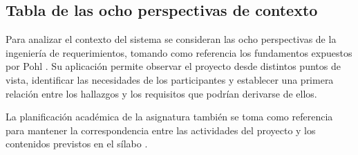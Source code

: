\documentclass[11pt,a4paper]{article}
\begin{document}
\subsection{Tabla de las ocho perspectivas de contexto}

Para analizar el contexto del sistema se consideran las ocho perspectivas de la ingeniería de requerimientos, tomando como referencia los fundamentos expuestos por Pohl \cite{pohl2015requirements}. Su aplicación permite observar el proyecto desde distintos puntos de vista, identificar las necesidades de los participantes y establecer una primera relación entre los hallazgos y los requisitos que podrían derivarse de ellos.

La planificación académica de la asignatura también se toma como referencia para mantener la correspondencia entre las actividades del proyecto y los contenidos previstos en el sílabo \cite{silabo_isr401}.

\end{document}

